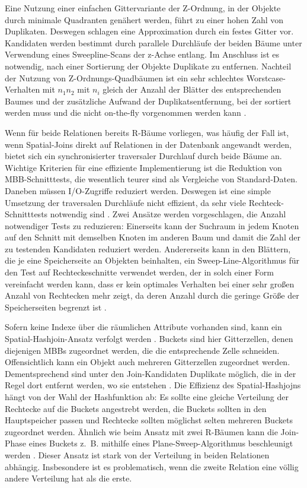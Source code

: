 \documentclass[a4paper,12pt,twoside]{article}
\begin{document}
Eine Nutzung einer einfachen Gittervariante der Z-Ordnung, in der Objekte durch minimale Quadranten genähert werden, führt zu einer hohen Zahl von Duplikaten. Deswegen schlagen {\textcite[S. 280f]{Rigaux2001}} eine Approximation durch ein festes Gitter vor. Kandidaten werden bestimmt durch parallele Durchläufe der beiden Bäume unter Verwendung eines Sweepline-Scans der z-Achse entlang. Im Anschluss ist es notwendig, nach einer Sortierung der Objekte Duplikate zu entfernen. Nachteil der Nutzung von Z-Ordnungs-Quadbäumen ist ein sehr schlechtes Worstcase-Verhalten mit $n_1 n_2$ mit $n_i$ gleich der Anzahl der Blätter des entsprechenden Baumes und der zusätzliche Aufwand der Duplikatsentfernung, bei der sortiert werden muss und die nicht on-the-fly vorgenommen werden kann {\autocite[S. 284]{Rigaux2001}}. 

Wenn für beide Relationen bereits R-Bäume vorliegen, was häufig der Fall ist, wenn Spatial-Joins direkt auf Relationen in der Datenbank angewandt werden, bietet sich ein synchronisierter traversaler Durchlauf durch beide Bäume an. Wichtige Kriterien für eine effiziente Implementierung ist die Reduktion von MBB-Schnitttests, die wesentlich teurer sind als Vergleiche von Standard-Daten. Daneben müssen I/O-Zugriffe reduziert werden. Deswegen ist eine simple Umsetzung der traversalen Durchläufe nicht effizient, da sehr viele Rechteck-Schnitttests notwendig sind {\autocite[S. 284f]{Rigaux2001}}. Zwei Ansätze werden vorgeschlagen, die Anzahl notwendiger Tests zu reduzieren: Einerseits kann der Suchraum in jedem Knoten auf den Schnitt mit demselben Knoten im anderen Baum und damit die Zahl der zu testenden Kandidaten reduziert werden. Andererseits kann in den Blättern, die je eine Speicherseite an Objekten beinhalten, ein Sweep-Line-Algorithmus für den Test auf Rechteckeschnitte verwendet werden, der in solch einer Form vereinfacht werden kann, dass er kein optimales Verhalten bei einer sehr großen Anzahl von Rechtecken mehr zeigt, da deren Anzahl durch die geringe Größe der Speicherseiten begrenzt ist {\autocite[S. 286f]{Rigaux2001}}. 

Sofern keine Indexe über die räumlichen Attribute vorhanden sind, kann ein Spatial-Hashjoin-Ansatz verfolgt werden {\autocite[S. 288]{Rigaux2001}}. Buckets sind hier Gitterzellen, denen diejenigen MBBs zugeordnet werden, die die entsprechende Zelle schneiden. Offensichtlich kann ein Objekt auch mehreren Gitterzellen zugeordnet werden. Dementsprechend sind unter den Join-Kandidaten Duplikate möglich, die in der Regel dort entfernt werden, wo sie entstehen {\autocite{Zhou1998, Luo2002}}. Die Effizienz des Spatial-Hashjojns hängt von der Wahl der Hashfunktion ab: Es sollte eine gleiche Verteilung der Rechtecke auf die Buckets angestrebt werden, die Buckets sollten in den Hauptspeicher passen und Rechtecke sollten möglichst selten mehreren Buckets zugeordnet werden. Ähnlich wie beim Ansatz mit zwei R-Bäumen kann die Join-Phase eines Buckets z.~B. mithilfe eines Plane-Sweep-Algorithmus beschleunigt werden {\autocite[S. 290]{Rigaux2001}}. Dieser Ansatz ist stark von der Verteilung in beiden Relationen abhängig. Insbesondere ist es problematisch, wenn die zweite Relation eine völlig andere Verteilung hat als die erste.
\end{document}

